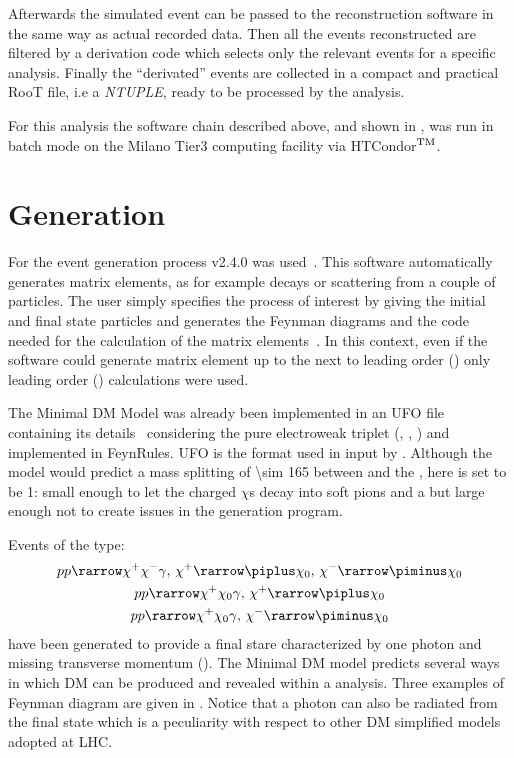 Afterwards the simulated event can be passed to the reconstruction software in the same way as actual recorded data. Then all the events reconstructed are filtered by a derivation code which selects only the  relevant events for a specific analysis. Finally the ``derivated'' events are collected in a compact and practical RooT file, i.e a \emph{NTUPLE}, ready to be processed by the analysis.

For this analysis the software chain described above, and shown in \Fig{\ref{fig:chain}}, was run in batch mode on the Milano Tier3 computing facility via HTCondor$^{\textup{TM}}$.



\section{Generation}

For the event generation process \MGMCatNLO v2.4.0 was used~\cite{madgraph}. This software automatically generates matrix elements, as for example decays or scattering from a couple of particles. The user simply specifies the process of interest by giving the initial and final state particles and \MADGRAPH generates the Feynman diagrams and the code needed for the calculation of the matrix elements~\cite{Pottgen:2016807}. In this context, even if the software could generate matrix element up to the next to leading order (\NLO) only leading order (\LO) calculations were used.

The Minimal DM Model was already been implemented in an UFO file containing its details~\cite{mperego} considering the pure electroweak triplet (\chip\!, \chizero\!, \chim\!) and implemented in FeynRules. UFO is the format used in input by \MADGRAPH. Although the model would predict a mass splitting of \SI{\sim 165}{\mev} between \chipm and the \chizero, here is set to be \SI{1}{\gev}: small enough to let the charged $\chi$s decay into soft pions and a \chizero but large enough not to create issues in the generation program. 

Events of the type: 
\begin{gather*}
p p \rarrow \chi^+ \chi^- \gamma,\, \chi^+ \rarrow \piplus \chi_0,\, \chi^- \rarrow \piminus \chi_0\\
p p \rarrow \chi^+ \chi_0 \gamma,\, \chi^+ \rarrow \piplus \chi_0\\
p p \rarrow \chi^+ \chi_0 \gamma,\, \chi^- \rarrow \piminus \chi_0
\end{gather*}
have been generated to provide a final stare characterized by one photon and missing transverse momentum (\met). The Minimal DM model predicts several ways in which DM can be produced and revealed within a \mph analysis. Three examples of Feynman diagram are given in \Fig{\ref{fig:feynman}}. Notice that a photon can also be radiated from the final state which is a peculiarity with respect to other DM simplified models adopted at LHC.

